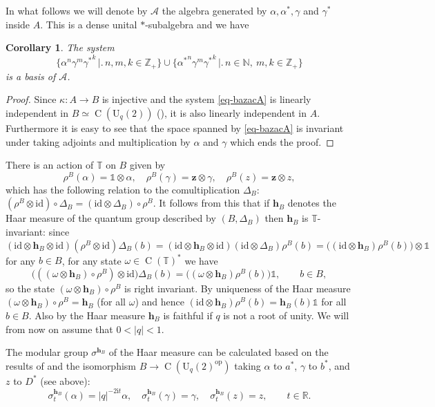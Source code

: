 \documentclass[12pt,reqno,a4paper]{amsart}
\newtheorem{corollary}[proposition]{Corollary}
\theoremstyle{definition}
\newcommand{\comp}{\circ}
\newcommand{\I}{\mathds{1}}
\newcommand{\id}{\mathrm{id}}
\newcommand{\ii}{\mathrm{i}}
\newcommand{\tens}{\otimes}
\newcommand{\NN}{\mathbb{N}}
\newcommand{\RR}{\mathbb{R}}
\newcommand{\TT}{\mathbb{T}}
\newcommand{\ZZ}{\mathbb{Z}}
\newcommand{\cA}{\mathscr{A}}
\newcommand{\bh}{{\boldsymbol{h}}}
\newcommand{\bz}{{\boldsymbol{z}}}
\DeclareMathOperator{\C}{C}
\newcommand{\kmap}{\kappa}
\numberwithin{equation}{section}
\begin{document}
In what follows we will denote by $\cA$ the algebra generated by $\alpha,\alpha^*,\gamma$ and $\gamma^*$ inside $A$. This is a dense unital $*$-subalgebra and we have

\begin{corollary}\label{cor-bazacA}
The system
\begin{equation}\label{eq-bazacA}
\bigl\{\alpha^n\gamma^m{\gamma^*}^k\,\bigr|\bigl.\,n,m,k\in\ZZ_+\bigr\}\cup\bigl\{{\alpha^*}^n\gamma^m{\gamma^*}^k\,\bigr|\bigl.\,n\in\NN,\:m,k\in\ZZ_+\bigr\}
\end{equation}
is a basis of $\cA$.
\end{corollary}

\begin{proof}
Since $\kmap\colon A\to B$ is injective and the system \eqref{eq-bazacA} is linearly independent in $B\simeq\C(\mathrm{U}_q(2))$ (\cite[Theorem 2.2]{ZhangZhao}), it is also linearly independent in $A$. Furthermore it is easy to see that the space spanned by \eqref{eq-bazacA} is invariant under taking adjoints and multiplication by $\alpha$ and $\gamma$ which ends the proof.
\end{proof}

There is an action of $\TT$ on $B$ given by
\[
\rho^B(\alpha)=\I\tens\alpha,\quad
\rho^B(\gamma)=\bz\tens\gamma,\quad
\rho^B(z)=\bz\tens z,
\]
which has the following relation to the comultiplication $\Delta_B$: $(\rho^B\tens\id)\comp\Delta_B=(\id\tens\Delta_B)\comp\rho^B$. It follows from this that if $\bh_B$ denotes the Haar measure of the quantum group described by $(B,\Delta_B)$ then $\bh_B$ is $\TT$-invariant: since
\[
(\id\tens\bh_B\tens\id)(\rho^B\tens\id)\Delta_B(b)=(\id\tens\bh_B\tens\id)(\id\tens\Delta_B)\rho^B(b)
=\bigl((\id\tens\bh_B)\rho^B(b)\bigr)\tens\I
\]
for any $b\in B$, for any state $\omega\in\C(\TT)^*$ we have
\[
\bigl(((\omega\tens\bh_B)\comp\rho^B)\tens\id\bigr)\Delta_B(b)
=\bigl((\omega\tens\bh_B)\rho^B(b)\bigr)\I,\qquad b\in B,
\]
so the state $(\omega\tens\bh_B)\comp\rho^B$ is right invariant. By uniqueness of the Haar measure $(\omega\tens\bh_B)\comp\rho^B=\bh_B$ (for all $\omega$) and hence $(\id\tens\bh_B)\rho^B(b)=\bh_B(b)\I$ for all $b\in B$. Also by \cite[Theorem 2.8]{GuinSaurabh} the Haar measure $\bh_B$ is faithful if $q$ is not a root of unity. We will from now on assume that $0<|q|<1$.

The modular group $\sigma^{\bh_B}$ of the Haar measure can be calculated based on the results of \cite{GuinSaurabh} and the isomorphism $B\to\C(\mathrm{U}_q(2)^{\operatorname{op}})$ taking $\alpha$ to $a^*$, $\gamma$ to $b^*$, and $z$ to $D^*$ (see above):
\[
\sigma^{\bh_B}_t(\alpha)=|q|^{-2\ii t}\alpha,\quad
\sigma^{\bh_B}_t(\gamma)=\gamma,\quad
\sigma^{\bh_B}_t(z)=z,\qquad t\in\RR.
\]
\end{document}
